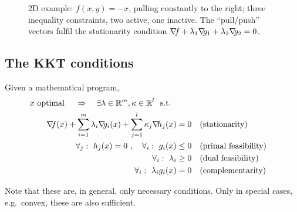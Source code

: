 \begin{figure}
\caption{\label{figKKTillu}
2D example: $f(x,y) = -x$, pulling constantly to the right;
three inequality constraints, two active, one inactive. The
``pull/push'' vectors fulfil the stationarity condition ${\nabla_{\!\!}} f
+ \lambda_1 {\nabla_{\!\!}} g_1 + \lambda_2 {\nabla_{\!\!}} g_2 = 0$. }
\end{figure}

\subsection{The KKT conditions}

\begin{myTheorem}
Given a mathematical program,
\begin{align*}
x \text{~optimal~} \quad\Rightarrow\quad \exists \lambda\in{\mathbb{R}}^m, \kappa\in{\mathbb{R}}^l ~~\text{s.t.}~~& \nonumber\\
{\nabla_{\!\!}} f(x) + \sum_{i=1}^m \lambda_i {\nabla_{\!\!}} g_i(x) + \sum_{j=1}^l \kappa_j {\nabla_{\!\!}} h_j(x)&= 0 && \text{(stationarity)}\\
\forall_j:~ h_j(x)=0 ~,\quad  \forall_i:~ g_i(x) &\le 0 && \text{(primal feasibility)}\\
\forall_i:~ \lambda_i &\ge 0  && \text{(dual feasibility)}\\
\forall_i:~ \lambda_i g_i(x) &= 0 && \text{(complementarity)}
\end{align*}
\end{myTheorem}
Note that these are, in general, only necessary conditions. Only in
special cases, e.g.\ convex, these are also sufficient.

